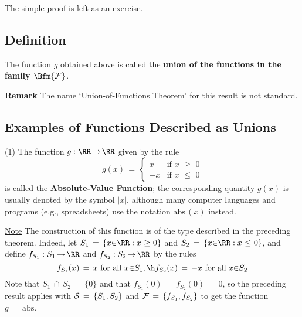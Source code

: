 \V

         The simple proof is left as an exercise.


\V

        \subsection{\small{{\bf Definition}}}
        \label{DefA30.28}

        The function $g$ obtained above is called the {\bf union of the functions in the family $\Bfm{{\cal F}}$}.

\V
\V

        {\bf Remark} The name `Union-of-Functions Theorem' for this result is not standard.

\V


        \subsection{\small{{\bf Examples of Functions Described as Unions}}}
        \label{ExampA30.29}

\V

\hspace*{\parindent}(1) The function $g:{\RR} \,{\rightarrow}\, {\RR}$ given by  the rule
        \begin{displaymath}
        g(x) \,=\, 
        \left\{
        \begin{array}{rl}
        x & \mbox{if $x\,\,{\geq}\,\,0$} \\
       -x & \mbox{if $x\,\,{\leq}\,\,0$}
        \end{array}
                    \right.
        \end{displaymath}
    is called  the {\bf Absolute-Value Function}; the corresponding quantity $g(x)$ is usually denoted by the symbol $|x|$,
    although many computer languages and programs (e.g., spreadsheets) use the notation $\mbox{abs}\,(x)$ instead.

    \underline{Note} The construction of this function is of the type described in the preceding theorem.
    Indeed, let $S_{1} \,=\, \{x{\in}{\RR}: x\,\,{\geq}\,\,0\}$ and $S_{2} \,=\, \{x{\in}{\RR}: x\,\,{\leq}\,\,0\}$,
    and define $f_{S_{1}}:S_{1} \,{\rightarrow}\, {\RR}$ and $f_{S_{2}}:S_{2} \,{\rightarrow}\, {\RR}$ by the rules
        \begin{displaymath}
        f_{S_{1}}(x) \,=\,  x \mbox{ for all $x{\in}S_{1}$}, \h
        f_{S_{2}}(x) \,=\, -x \mbox{ for all $x{\in}S_{2}$}
        \end{displaymath}
    Note that $S_{1}\,{\cap}\,S_{2} \,=\, \{0\}$ and that $f_{S_{1}}(0) \,=\, f_{S_{2}}(0) \,=\, 0$,
    so the preceding result applies with ${\cal S} \,=\, \{S_{1},S_{2}\}$ and ${\cal F} \,=\, \{f_{S_{1}},f_{S_{2}}\}$ to get the function $g \,=\, \mbox{abs}$.

